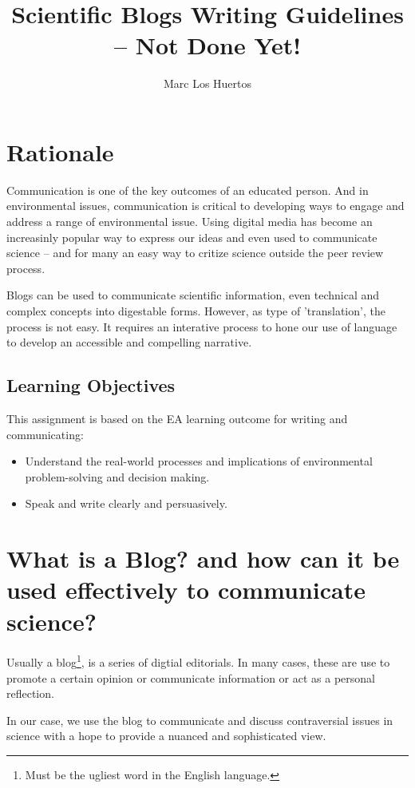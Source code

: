 \documentclass{tufte-handout}\usepackage[]{graphicx}\usepackage[]{color}
\title{Scientific Blogs Writing Guidelines -- Not Done Yet! %
}
\author[Marc Los Huertos]{Marc Los Huertos}
\begin{document}
\maketitle

\section{Rationale}

Communication is one of the key outcomes of an educated person. And in environmental issues, communication is critical to developing ways to engage and address a range of environmental issue. Using digital media has become an increasinly popular way to express our ideas and even used to communicate science -- and for many an easy way to critize science outside the peer review process. 

Blogs can be used to communicate scientific information, even technical and complex concepts into digestable forms. However, as type of 'translation', the process is not easy. It requires an interative process to hone our use of language to develop an accessible and compelling narrative. 

\subsection{Learning Objectives}

This assignment is based on the EA learning outcome for writing and communicating: 

\begin{itemize}
	\item Understand the real-world processes and implications of environmental problem-solving and decision making.
	\item Speak and write clearly and persuasively.
\end{itemize}

\section{What is a Blog? and how can it be used effectively to communicate science?}

Usually a blog\footnote{Must be the ugliest word in the English language.}, is a series of digtial editorials. In many cases, these are use to promote a certain opinion or communicate information or act as a personal reflection. 

In our case, we use the blog to communicate and discuss contraversial issues in science with a hope to provide a nuanced and sophisticated view. 
\end{document}
